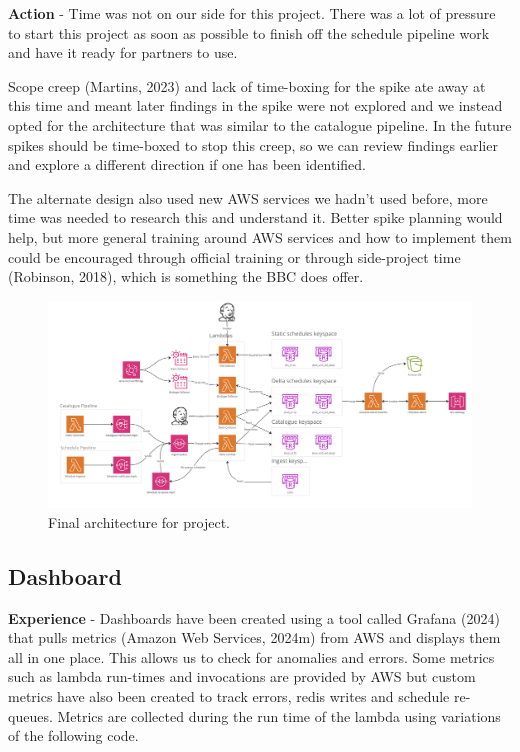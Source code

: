   \vspace{0.2cm}
  \textbf{Action} - Time was not on our side for this project. There was a lot of pressure to start this project as soon as possible to finish off the 
  schedule pipeline work and have it ready for partners to use.

  Scope creep (Martins, 2023) and lack of time-boxing for the spike ate away at this time and meant later findings in the spike were not explored and we 
  instead opted for the architecture that was similar to the catalogue pipeline. In the future spikes should be time-boxed to stop this creep, 
  so we can review findings earlier and explore a different direction if one has been identified.

  The alternate design also used new AWS services we hadn't used before, more time was needed to research this and understand it. Better spike planning 
  would help, but more general training around AWS services and how to implement them could be encouraged through official training or through side-project
  time (Robinson, 2018), which is something the BBC does offer.

  \begin{landscape}
    \begin{figure}[H]
      \centering
      \includegraphics[width=20cm]{assets/outputs/finalArchitecture.png}
      \caption{Final architecture for project.}
      \label{fig:finalArchitecture}
    \end{figure}
  \end{landscape}

  \newpage
  \subsection{Dashboard}

  \textbf{Experience} - Dashboards have been created using a tool called Grafana (2024) that pulls metrics (Amazon Web Services, 2024m) from AWS and
  displays them all in one place. This allows us to check for anomalies and errors. Some metrics such as lambda run-times and invocations are provided by 
  AWS but custom metrics have also been created to track errors, redis writes and schedule re-queues. Metrics are collected during the run time of the 
  lambda using variations of the following code.

